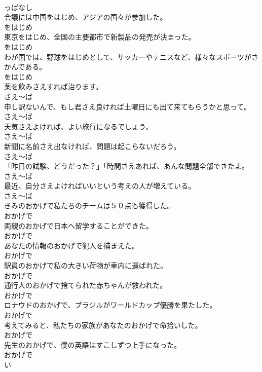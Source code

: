 \documentclass[8pt]{extreport}
\begin{document}
\begin{CJK}{UTF8}{min}
\\	っぱなし
\\	会議には中国をはじめ、アジアの国々が参加した。	
\\	をはじめ
\\	東京をはじめ、全国の主要都市で新製品の発売が決まった。	
\\	をはじめ
\\	わが国では、野球をはじめとして、サッカーやテニスなど、様々なスポーツがさかんである。	
\\	をはじめ
\\	薬を飲みさえすれば治ります。	
\\	さえ～ば
\\	申し訳ないんで、もし君さえ良ければ土曜日にも出て来てもらうかと思って。	
\\	さえ～ば
\\	天気さえよければ、よい旅行になるでしょう。	
\\	さえ～ば
\\	新聞に名前さえ出なければ、問題は起こらないだろう。	
\\	さえ～ば
\\	「昨日の試験、どうだった？」「時間さえあれば、あんな問題全部できたよ。	
\\	さえ～ば
\\	最近、自分さえよければいいという考えの人が増えている。	
\\	さえ～ば
\\	きみのおかげで私たちのチームは５０点も獲得した。	
\\	おかげで
\\	両親のおかげで日本へ留学することができた。	
\\	おかげで
\\	あなたの情報のおかげで犯人を捕まえた。	
\\	おかげで
\\	駅員のおかげで私の大きい荷物が車内に運ばれた。	
\\	おかげで
\\	通行人のおかげで捨てられた赤ちゃんが救われた。	
\\	おかげで
\\	ロナウドのおかげで、ブラジルがワールドカップ優勝を果たした。	
\\	おかげで
\\	考えてみると、私たちの家族があなたのおかげで命拾いした。	
\\	おかげで
\\	先生のおかげで、僕の英語はすこしずつ上手になった。	
\\	おかげで
\\	い

\end{CJK}
\end{document}
